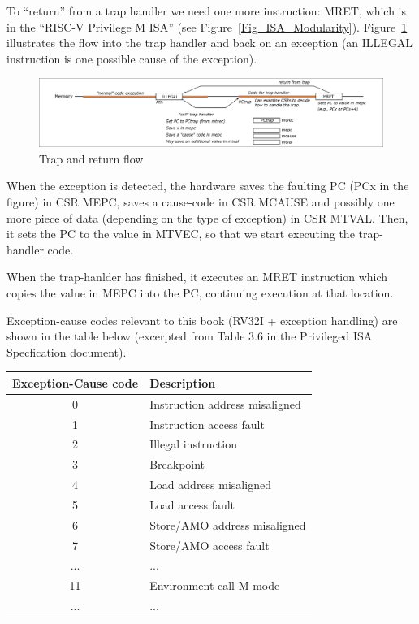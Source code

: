 To ``return'' from a trap handler we need one more instruction: MRET,
which is in the ``RISC-V Privilege M ISA'' (see
Figure~\ref{Fig_ISA_Modularity}).  Figure~\ref{Fig_Trap_Return}
illustrates the flow into the trap handler and back on an exception
(an ILLEGAL instruction is one possible cause of the exception).
\begin{figure}[htbp]
  \centerline{\includegraphics[width=6in,angle=0]{Figures/Fig_Trap_Return}}
  \caption{\label{Fig_Trap_Return} Trap and return flow}
\end{figure}

When the exception is detected, the hardware saves the faulting PC
(PCx in the figure) in CSR MEPC, saves a cause-code in CSR MCAUSE and
possibly one more piece of data (depending on the type of exception)
in CSR MTVAL.  Then, it sets the PC to the value in MTVEC, so that we
start executing the trap-handler code.

When the trap-hanlder has finished, it executes an MRET instruction
which copies the value in MEPC into the PC, continuing execution at
that location.

Exception-cause codes relevant to this book (RV32I + exception
handling) are shown in the table below (excerpted from Table 3.6 in
the Privileged ISA Specfication document).

\begin{center}
 \begin{tabular}{|c|l|}
  \hline
  Exception-Cause code & Description \\
  \hline
  0 & Instruction address misaligned \\
  1 & Instruction access fault \\
  2 & Illegal instruction \\
  3 & Breakpoint \\
  4 & Load address misaligned \\
  5 & Load access fault \\
  6 & Store/AMO address misaligned \\
  7 & Store/AMO access fault \\
  ... & ... \\
  11 & Environment call M-mode \\
  ... & ... \\
  \hline
 \end{tabular}
\end{center}

